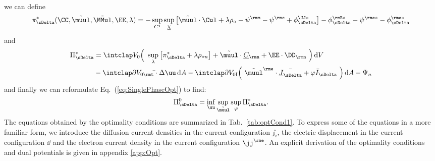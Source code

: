 we can define
\begin{align}
  \piDeltas(\CC,\muultilde,\MMultilde,\EE,\lambda) = -\sup_{\Ct}\sup_{\chiul} \big[ \muultilde\cdot\Cul + \lambda \rho_\circ - \psim - \psic + \phiJJDeltas \big] - \phiRDeltas - \psies - \phieDeltas
\end{align}
and
\begin{align}
  \begin{aligned}
    \PiDeltas &= \intVO \Big( \ \sup_{\lambda} \big[ \piDeltas + \lambda \rho_{\circ n} \big] + \muultilde\cdot\Culn + \EE\cdot\DD_\rmn \ \Big) \dV \\
              &- \intdVOt \bar\tt\cdot\Delta\uu \dA - \intdVOx{I} \Big( \ \muuletilde \cdot \bar\JulDelta + \varphi \bar I_{\sDelta} \ \Big) \dA - \Psi_n
  \end{aligned}
\end{align}
and finally we can reformulate Eq.~(\ref{eq:SinglePhaseOpt}) to find:
\begin{align}
  \PiDeltaO =  \inf_{\uu} \sup_{\muultilde} \sup_{\varphi} \PiDeltas.
\end{align}
The equations obtained by the optimality conditions are summarized in Tab.~{\ref{tab:optCond1}}. To express some of the equations in a more familiar form, we introduce the diffusion current densities in the current configuration $\jj_i$, the electric displacement in the current configuration $\dd$ and the electron current density in the current configuration $\jje$. An explicit derivation of the optimality conditions and dual potentials is given in appendix \ref{app:Opt}. 


